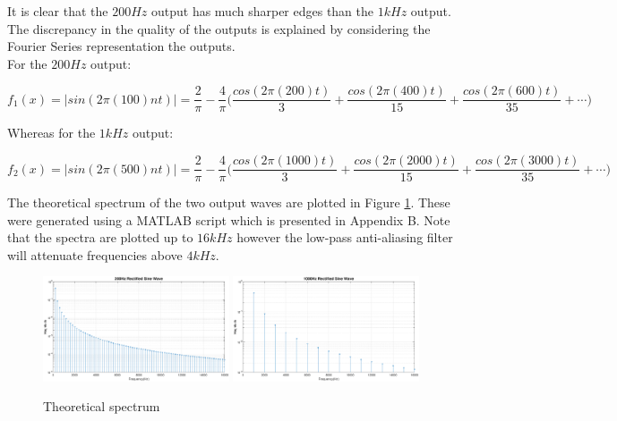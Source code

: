 \documentclass{article}
\begin{document}
It is clear that the $200Hz$ output has much sharper edges than the $1kHz$ output. The discrepancy in the quality of the outputs is explained by considering the Fourier Series representation the outputs.\\

For the $200Hz$ output:

\begin{equation}
    f_{1}(x) = |sin(2\pi (100)nt)| = \frac{2}{\pi}-\frac{4}{\pi}\Bigg(\frac{cos(2\pi (200)t)}{3}+\frac{cos(2\pi (400)t)}{15} + \frac{cos(2\pi (600)t)}{35} + \cdots\Bigg)
\end{equation}

Whereas for the $1kHz$ output:

\begin{equation}
    f_{2}(x) = |sin(2\pi (500)nt)| = \frac{2}{\pi}-\frac{4}{\pi}\Bigg(\frac{cos(2\pi (1000)t)}{3}+\frac{cos(2\pi (2000)t)}{15} + \frac{cos(2\pi (3000)t)}{35} + \cdots\Bigg)
\end{equation}

The theoretical spectrum of the two output waves are plotted in Figure \ref{fig:theoretical_spectrum}. These were generated using a MATLAB script which is presented in Appendix B. Note that the spectra are plotted up to $16kHz$ however the low-pass anti-aliasing filter will attenuate frequencies above $4kHz$. 

\begin{figure}[H]
    \centering
    \includegraphics[width=0.49\textwidth]{200Hz_rectified_sine_wave.eps}
    \includegraphics[width=0.49\textwidth]{1000Hz_rectified_sine_wave.eps}
    \caption{Theoretical spectrum}
    \label{fig:theoretical_spectrum}
\end{figure}
\end{document}
